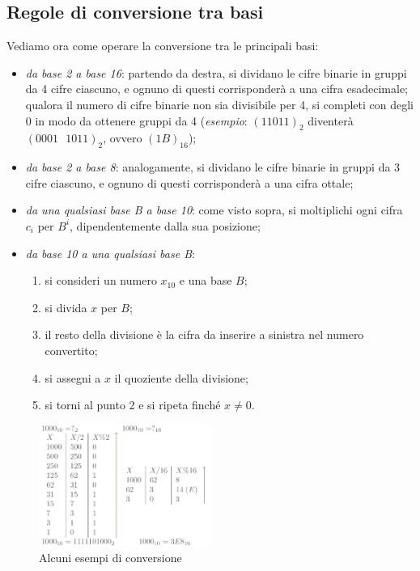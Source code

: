 \documentclass[class=book, crop=false, oneside]{standalone}
\begin{document}
\subsection{Regole di conversione tra basi}
Vediamo ora come operare la conversione tra le principali basi:
\begin{itemize}
	\item \emph{da base 2 a base 16}: partendo da destra, si dividano le cifre binarie in gruppi da 4 cifre ciascuno, e ognuno di questi corrisponderà a una cifra esadecimale; qualora il numero di cifre binarie non sia divisibile per 4, si completi con degli 0 in modo da ottenere gruppi da 4 (\emph{esempio}: \((11011)_{2}\) diventerà \((0001\text{ }1011)_{2}\), ovvero \((1B)_{16}\));
	\item \emph{da base 2 a base 8}: analogamente, si dividano le cifre binarie in gruppi da 3 cifre ciascuno, e ognuno di questi corrisponderà a una cifra ottale;
	\item \emph{da una qualsiasi base B a base 10}: come visto sopra, si moltiplichi ogni cifra $c_{i}$ per $B^{i}$, dipendentemente dalla sua posizione;
	\item \emph{da base 10 a una qualsiasi base B}:
	\begin{enumerate}
		\item si consideri un numero \(x_{10}\) e una base \(B\);
		\item si divida \(x\) per \(B\);
		\item il resto della divisione è la cifra da inserire a sinistra nel numero convertito;
		\item si assegni a \(x\) il quoziente della divisione;
		\item si torni al punto 2 e si ripeta finché \(x\neq0\).
	\end{enumerate}
\end{itemize}
\begin{figure}[h!]
	\centering
	\includegraphics[width=0.5\textwidth,keepaspectratio]{esempi_conversioni.png}
	\caption{Alcuni esempi di conversione}
\end{figure}
\end{document}

